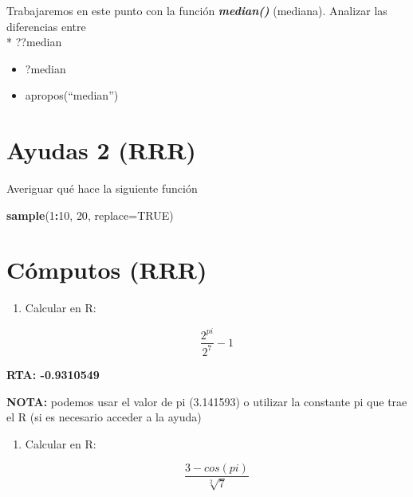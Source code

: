\documentclass[]{book}
\newenvironment{Shaded}{\begin{snugshade}}{\end{snugshade}}
\newcommand{\DataTypeTok}[1]{\textcolor[rgb]{0.13,0.29,0.53}{#1}}
\newcommand{\DecValTok}[1]{\textcolor[rgb]{0.00,0.00,0.81}{#1}}
\newcommand{\KeywordTok}[1]{\textcolor[rgb]{0.13,0.29,0.53}{\textbf{#1}}}
\newcommand{\NormalTok}[1]{#1}
\newcommand{\OperatorTok}[1]{\textcolor[rgb]{0.81,0.36,0.00}{\textbf{#1}}}
\newcommand{\OtherTok}[1]{\textcolor[rgb]{0.56,0.35,0.01}{#1}}
\providecommand{\tightlist}{%
  \setlength{\itemsep}{0pt}\setlength{\parskip}{0pt}}
\begin{document}
Trabajaremos en este punto con la función \emph{\textbf{median()}} (mediana). Analizar las diferencias entre\\
* ??median

\begin{itemize}
\tightlist
\item
  ?median
\end{itemize}

\begin{itemize}
\tightlist
\item
  apropos(``median'')
\end{itemize}

\hypertarget{ayudas-2-rrr}{%
\section{Ayudas 2 (RRR)}\label{ayudas-2-rrr}}

Averiguar qué hace la siguiente función

\begin{Shaded}
\begin{Highlighting}[]
\KeywordTok{sample}\NormalTok{(}\DecValTok{1}\OperatorTok{:}\DecValTok{10}\NormalTok{, }\DecValTok{20}\NormalTok{, }\DataTypeTok{replace=}\OtherTok{TRUE}\NormalTok{)}
\end{Highlighting}
\end{Shaded}

\hypertarget{cuxf3mputos-rrr}{%
\section{Cómputos (RRR)}\label{cuxf3mputos-rrr}}

\begin{enumerate}
\def\labelenumi{\arabic{enumi}.}
\item
  Calcular en R:

  \[\frac{2^{pi}}{2^{7}}-1\]
\end{enumerate}

\textbf{RTA: -0.9310549 }

\textbf{NOTA:} podemos usar el valor de pi (3.141593) o utilizar la constante pi que trae el R (si es necesario acceder a la ayuda)

\begin{enumerate}
\def\labelenumi{\arabic{enumi}.}
\setcounter{enumi}{1}
\item
  Calcular en R:

  \[\frac{3 - cos({pi})} {\sqrt[2]{7}}\]
\end{enumerate}
\end{document}

